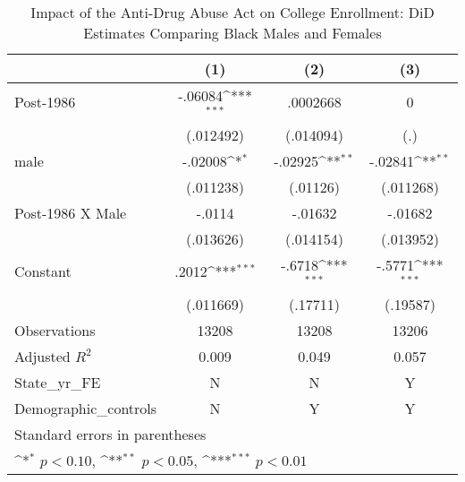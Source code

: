 \begin{table}[htbp]\centering
\def\sym#1{\ifmmode^{#1}\else\(^{#1}\)\fi}
\caption{Impact of the Anti-Drug Abuse Act on College Enrollment: DiD Estimates Comparing Black Males and Females}
\begin{tabular}{l*{3}{c}}
\hline\hline
                    &\multicolumn{1}{c}{(1)}         &\multicolumn{1}{c}{(2)}         &\multicolumn{1}{c}{(3)}         \\
\hline
Post-1986           &     -.06084\sym{***}&    .0002668         &           0         \\
                    &   (.012492)         &   (.014094)         &         (.)         \\
[1em]
male                &     -.02008\sym{*}  &     -.02925\sym{**} &     -.02841\sym{**} \\
                    &   (.011238)         &    (.01126)         &   (.011268)         \\
[1em]
Post-1986 X Male    &      -.0114         &     -.01632         &     -.01682         \\
                    &   (.013626)         &   (.014154)         &   (.013952)         \\
[1em]
Constant            &       .2012\sym{***}&      -.6718\sym{***}&      -.5771\sym{***}\\
                    &   (.011669)         &    (.17711)         &    (.19587)         \\
\hline
Observations        &       13208         &       13208         &       13206         \\
Adjusted \(R^{2}\)  &       0.009         &       0.049         &       0.057         \\
State\_yr\_FE         &           N         &           N         &           Y         \\
Demographic\_controls&           N         &           Y         &           Y         \\
\hline\hline
\multicolumn{4}{l}{\footnotesize Standard errors in parentheses}\\
\multicolumn{4}{l}{\footnotesize \sym{*} \(p<0.10\), \sym{**} \(p<0.05\), \sym{***} \(p<0.01\)}\\
\end{tabular}
\end{table}
